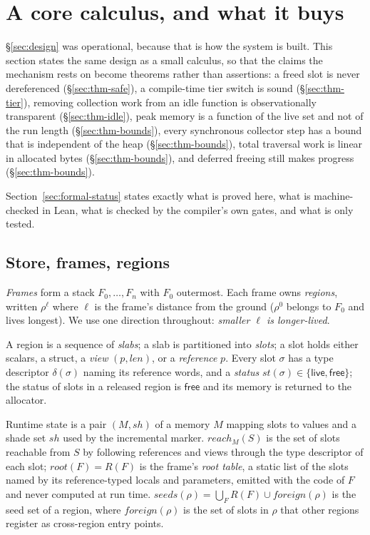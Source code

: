 \section{A core calculus, and what it buys}
\label{sec:formal}

\S\ref{sec:design} was operational, because that is how the system is built.
This section states the same design as a small calculus, so that the claims the mechanism rests on
become theorems rather than assertions: a freed slot is never dereferenced (\S\ref{sec:thm-safe}),
a compile-time tier switch is sound (\S\ref{sec:thm-tier}), removing collection work from an idle
function is observationally transparent (\S\ref{sec:thm-idle}), peak memory is a function of the live
set and not of the run length (\S\ref{sec:thm-bounds}), every synchronous collector step has a bound
that is independent of the heap (\S\ref{sec:thm-bounds}), total traversal work is linear in allocated
bytes (\S\ref{sec:thm-bounds}), and deferred freeing still makes progress
(\S\ref{sec:thm-bounds}).

Section~\ref{sec:formal-status} states exactly what is proved here, what is machine-checked in Lean,
what is checked by the compiler's own gates, and what is only tested.

\subsection{Store, frames, regions}
\label{sec:machine}

\emph{Frames} form a stack $F_0, \dots, F_n$ with $F_0$ outermost.
Each frame owns \emph{regions}, written $\rho^{\ell}$ where $\ell$ is the frame's distance from the
ground ($\rho^{0}$ belongs to $F_0$ and lives longest).
We use one direction throughout: \emph{smaller $\ell$ is longer-lived}.

A region is a sequence of \emph{slabs}; a slab is partitioned into \emph{slots}; a slot holds
either scalars, a struct, a \emph{view} $(p, \mathit{len})$, or a \emph{reference} $p$.
Every slot $\sigma$ has a type descriptor $\delta(\sigma)$ naming its reference words, and a
\emph{status} $\mathit{st}(\sigma) \in \{\mathsf{live}, \mathsf{free}\}$; the status of slots in a
released region is $\mathsf{free}$ and its memory is returned to the allocator.

Runtime state is a pair $(M, \mathit{sh})$ of a memory $M$ mapping slots to values and a shade set
$\mathit{sh}$ used by the incremental marker.
$\mathit{reach}_M(S)$ is the set of slots reachable from $S$ by following references and views
through the type descriptor of each slot; $\mathit{root}(F) = R(F)$ is the frame's \emph{root table},
a static list of the slots named by its reference-typed locals and parameters, emitted with the code
of $F$ and never computed at run time.
$\mathit{seeds}(\rho) = \bigcup_F R(F) \cup \mathit{foreign}(\rho)$ is the seed set of a region,
where $\mathit{foreign}(\rho)$ is the set of slots in $\rho$ that other regions register as
cross-region entry points.

